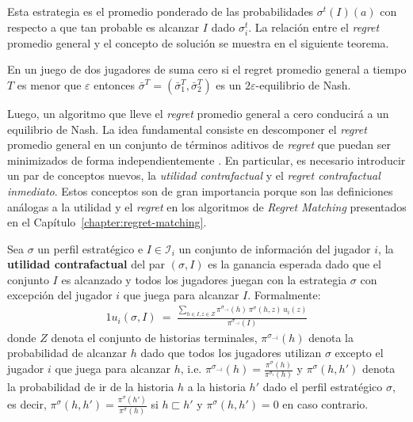 Esta estrategia es el promedio ponderado de las probabilidades $\sigma^t(I)(a)$ con respecto a que tan probable es alcanzar $I$ dado $\sigma_i^t$. La relación entre el \textit{regret} promedio general y el concepto de solución se muestra en el siguiente teorema.

\begin{theorem}
\label{theo:regret-nash}
En un juego de dos jugadores de suma cero si el regret promedio general a tiempo $T$ es menor que $\varepsilon$ entonces $\bar{\sigma}^{T}=(\bar\sigma^T_1,\bar\sigma^T_2)$ es un $2\varepsilon$-equilibrio de Nash.
\end{theorem}

Luego, un algoritmo que lleve el \mbox{\textit{regret}} promedio general a cero conducirá a un equilibrio de Nash. La idea fundamental consiste en descomponer el \textit{regret} promedio general en un conjunto de términos aditivos de \textit{regret} que puedan ser minimizados de forma independientemente \cite{bib:cfr}. En particular, es necesario introducir un par de conceptos nuevos, la \textit{utilidad contrafactual} y el \textit{regret contrafactual inmediato}. Estos conceptos son de gran importancia porque son las definiciones análogas a la utilidad y el \textit{regret} en los algoritmos de \textit{Regret Matching} presentados en el Capítulo~\ref{chapter:regret-matching}.

\begin{definition}
\label{def:utilidad-contrafactual}
Sea $\sigma$ un perfil estratégico e $I \in \mathcal{I}_i$ un conjunto de información del jugador $i$, la \textbf{utilidad contrafactual} del par $(\sigma,I)$ es la ganancia esperada dado que el conjunto $I$ es alcanzado y todos los jugadores juegan con la estrategia $\sigma$ con excepción del jugador $i$ que juega para alcanzar $I$. Formalmente: 
\begin{alignat}{1}
u_i(\sigma, I)\ =\ \frac{\sum_{h \in I, z \in Z} \pi^{\sigma_{-i}}(h)\, \pi^{\sigma}(h, z)\, u_i(z)}{\pi^{\sigma_{-i}}(I)}
\end{alignat}
donde $Z$ denota el conjunto de historias terminales, $\pi^{\sigma_{-i}}(h)$ denota la probabilidad de alcanzar $h$ dado que todos los jugadores utilizan $\sigma$ excepto el jugador $i$ que juega para alcanzar $h$, i.e. $\pi^{\sigma_{-i}}(h) = \frac{\pi^{\sigma}(h)}{\pi^{\sigma_i}(h)}$ y $\pi^{\sigma}(h, h')$ denota la probabilidad de ir de la historia $h$ a la historia $h'$ dado el perfil estratégico $\sigma$, es decir, $\pi^{\sigma}(h, h') = \frac{\pi^{\sigma}(h')}{\pi^{\sigma}(h)}$ si $h \sqsubset h'$ y  $\pi^{\sigma}(h, h') = 0$ en caso contrario.
\end{definition}

